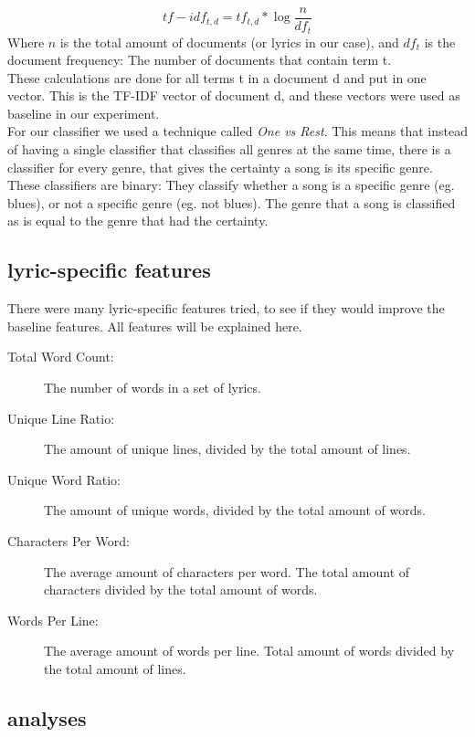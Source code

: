 \documentclass{article}
\begin{document}
$$tf-idf_{t,d} = tf_{t,d}*\log{\frac{n}{df_{t}}}$$
Where $n$ is the total amount of documents (or lyrics in our case), and  $df_{t}$ is the document frequency: The number of documents that contain term t.\\[2ex]
These calculations are done for all terms t in a document d and put in one vector. This is the TF-IDF vector of document d, and these vectors were used as baseline in our experiment.\\[2ex]
For our classifier we used a technique called \textit{One vs Rest}. This means that instead of having a single classifier that classifies all genres at the same time, there is a classifier for every genre, that gives the certainty a song is its specific genre. These classifiers are binary: They classify whether a song is a specific genre (eg. blues), or not a specific genre (eg. not blues). The genre that a song is classified as is equal to the genre that had the certainty.
\subsection{lyric-specific features}
There were many lyric-specific features tried, to see if they would improve the baseline features. All features will be explained here.
\begin{description}
\item [Total Word Count:] The number of words in a set of lyrics.
\item [Unique Line Ratio:] The amount of unique lines, divided by the total amount of lines.
\item [Unique Word Ratio:] The amount of unique words, divided by the total amount of words.
\item [Characters Per Word:] The average amount of characters per word. The total amount of characters divided by the total amount of words.
\item [Words Per Line:] The average amount of words per line. Total amount of words divided by the total amount of lines.
\end{description}

\subsection{analyses}
\end{document}

